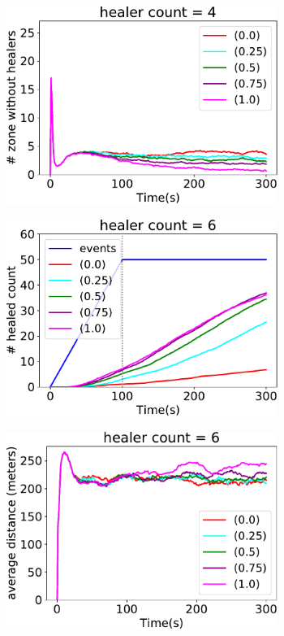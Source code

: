 \documentclass[jsan,article,accept,moreauthors,pdftex]{Definitions/mdpi}
\begin{document}
\begin{figure}[H]
\begin{subfigure}[b]{0.32\textwidth}
\includegraphics[width=0.97\textwidth]{imgs/empty-zone-4.pdf}
\end{subfigure}
\par\bigskip %
\centering
\begin{subfigure}[b]{0.32\textwidth}
\centering
\includegraphics[width=0.97\textwidth]{imgs/healed-6.pdf}
\end{subfigure}
\hfill
%
\begin{subfigure}[b]{0.32\textwidth}
\centering
\includegraphics[width=0.97\textwidth]{imgs/avg-distance-from-leader-6.pdf}

\end{subfigure}
\end{figure}
\end{document}
